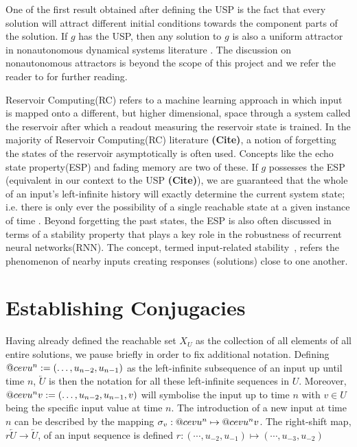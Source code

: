 \documentclass[a4paper,12pt,twoside]{report}
\makeatletter
\DeclareRobustCommand{\cev}[1]{%
  \mathpalette\do@cev{#1}%
}
\newcommand{\do@cev}[2]{%
  \fix@cev{#1}{+}%
  \reflectbox{$\m@th#1\vec{\reflectbox{$\fix@cev{#1}{-}\m@th#1#2\fix@cev{#1}{+}$}}$}%
  \fix@cev{#1}{-}%
}
\newcommand{\fix@cev}[2]{%
  \ifx#1\displaystyle
    \mkern#20mu
  \else
    \ifx#1\textstyle
      \mkern#20mu
    \else
      \ifx#1\scriptstyle
        \mkern#26mu
      \else
        \mkern#26mu
      \fi
    \fi
  \fi
}
\makeatother
\begin{document}
One of the first result obtained after defining the USP is the fact that every solution will attract different initial conditions towards the component parts of the solution. %
If $g$ has the USP, then any solution to $g$ is also a uniform attractor in nonautonomous dynamical systems literature \cite{Manju_Nonlinearity}. The discussion on nonautonomous attractors is beyond the scope of this project and we refer the reader to \cite{Manju_ESP, esann2012ids} for further reading. 


 Reservoir Computing(RC) refers to a machine learning approach in which input is mapped onto a different, but higher dimensional, space through a system called the reservoir after which a readout measuring the reservoir state is trained.
In the majority of Reservoir Computing(RC) literature \textbf{(Cite)}, a notion of forgetting the states of the reservoir asymptotically is often used.  
Concepts like the echo state property(ESP) and  fading memory \cite{boyd1985fading} are two of these.  
If $g$ possesses the ESP (equivalent in our context to the USP \textbf{(Cite)}), we are guaranteed that the whole of an input's left-infinite history will exactly determine the current system state; i.e. there is only ever the possibility of a single reachable state at a given instance of time \cite{jaeger2001echo,Manju_2020}.
Beyond forgetting the past states, the ESP is also often discussed in terms of a stability property that plays a key role in the robustness of recurrent neural networks(RNN).
The concept, termed input-related stability~\cite{manjunath2020stability}, refers the phenomenon of nearby inputs creating responses (solutions) close to one another.

\section{Establishing Conjugacies}

Having already defined the reachable set $X_U$ as the collection of all elements of all entire solutions, we pause briefly in order to fix additional notation.
Defining $\cev{u}^{n}:=(\ldots,u_{n-2} ,u_{n-1})$ as the left-infinite subsequence of an input up until time $n$, $\overleftarrow{U}$ is then the notation for all these left-infinite sequences in $U$. 
Moreover, $\cev{u}^{n}v:=(\ldots,u_{n-2} ,u_{n-1}, v)$ will symbolise the input up to time $n$ with $v \in U$ being the specific input value at time $n$. 
The introduction of a new input at time $n$ can be described by the mapping $\sigma_v:   \cev{u}^{n} \mapsto \cev{u}^{n}v$. 
The right-shift map, $r\overleftarrow{U}\to\overleftarrow{U}$, of an input sequence is defined $r: (\cdots, u_{-2},u_{-1}) \mapsto(\cdots, u_{-3},u_{-2})$
\end{document}
